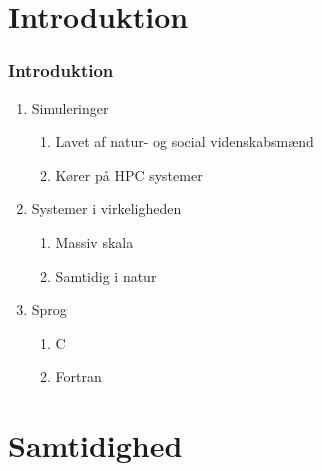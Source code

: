 \section{Introduktion}
\begin{frame}
  \frametitle{Introduktion}
  \begin{enumerate}
    \item Simuleringer
    \begin{enumerate}
      \item Lavet af natur- og social videnskabsmænd
      \item Kører på HPC systemer
    \end{enumerate}
    \item Systemer i virkeligheden
    \begin{enumerate}
      \item Massiv skala
      \item Samtidig i natur
    \end{enumerate}
    \item Sprog
    \begin{enumerate}
      \item C
      \item Fortran
    \end{enumerate}
  \end{enumerate}
\end{frame}

\section{Samtidighed}

